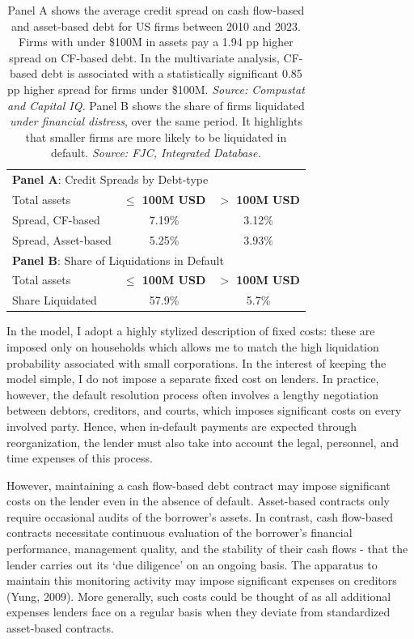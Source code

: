 \documentclass[12pt]{article}
\begin{document}
\begin{table}[H]
    \centering
    \begin{tabular}{lcc}
        
        \multicolumn{3}{l}{\textbf{Panel A}: Credit Spreads by Debt-type}\\
        Total assets & \textbf{$\leq$ 100M USD} & \textbf{$>$ 100M USD} \\
        \hline
        Spread, CF-based    & 7.19\% & 3.12\% \\
        Spread, Asset-based  & 5.25\% & 3.93\% \vspace{5mm} \\
        \multicolumn{3}{l}{\textbf{Panel B}: Share of Liquidations in Default} \\
        Total assets   & \textbf{$\leq$ 100M USD} & \textbf{$>$ 100M USD} \\
        \hline
        Share Liquidated  & 57.9\% & 5.7\% \\
           \end{tabular}
\caption{\small 
Panel A shows the average credit spread on cash flow-based and asset-based debt for US firms between 2010 and 2023. Firms with under \$100M in assets pay a 1.94 pp higher spread on CF-based debt. In the multivariate analysis, CF-based debt is associated with a statistically significant 0.85 pp higher spread for firms under \$100M. \textit{Source: Compustat and Capital IQ.} 
Panel B shows the share of firms liquidated \textit{under financial distress}, over the same period. It highlights that smaller firms are more likely to be liquidated in default. \textit{Source: FJC, Integrated Database.}
}
    \label{tab:motivation}
\end{table}

In the model, I adopt a highly stylized description of fixed costs: these are imposed only on households which allows me to match the high liquidation probability associated with small corporations. In the interest of keeping the model simple, I do not impose a separate fixed cost on lenders. In practice, however, the default resolution process often involves a lengthy negotiation between debtors, creditors, and courts, which imposes significant costs on every involved party. Hence, when in-default payments are expected through reorganization, the lender must also take into account the legal, personnel, and time expenses of this process. 

However, maintaining a cash flow-based debt contract may impose significant costs on the lender even in the absence of default. Asset-based contracts only require occasional audits of the borrower's assets. In contrast, cash flow-based contracts necessitate continuous evaluation of the borrower's financial performance, management quality, and the stability of their cash flows - that the lender carries out its `due diligence' on an ongoing basis. The apparatus to maintain this monitoring activity may impose significant expenses on creditors (Yung, 2009). More generally, such costs could be thought of as all additional expenses lenders face on a regular basis when they deviate from standardized asset-based contracts.
\end{document}
